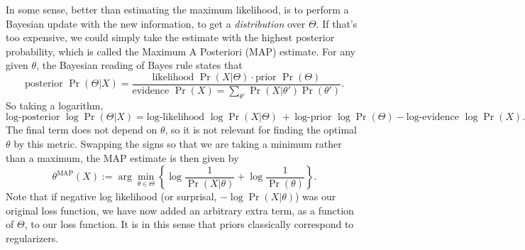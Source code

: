 \begin{subappendices}
In some sense, better than estimating the maximum likelihood, is to perform a Bayesian update with the new information, to get a \emph{distribution} over $\Theta$.
If that's too expensive, we could simply take the estimate with the highest posterior probability, which is called the Maximum A Posteriori (MAP) estimate.
For any given $\theta$, the Bayesian reading of Bayes rule states that
\[
	\text{posterior $\Pr(\Theta | X)$} = \frac
		{\text{likelihood $\Pr(X|\Theta)$}\cdot\text{prior $\Pr(\Theta)$}}{\text{evidence $\Pr(X) = \sum_{\theta'} \Pr(X|\theta')\Pr(\theta')$}}.
\]
So taking a logarithm,
\[
	\text{log-posterior $\log \Pr(\Theta | X)$} = \text{log-likelihood $\log \Pr(X|\Theta)$} ~+~ \text{log-prior $\log \Pr(\Theta)$}
		- \text{log-evidence $\log \Pr(X)$}.
\]
The final term does not depend on $\theta$, so it is not relevant for finding the optimal $\theta$ by this metric. Swapping the signs so that we are taking a minimum rather than a maximum, the MAP estimate is then given by
\[
 	\theta^{\mathrm{MAP}}(X) := \arg\min_{\theta \in \Theta} \left\{ \log \frac{1}{\Pr(X|\theta)} + \log \frac1{\Pr(\theta)} \right\}.
\]
Note that if negative log likelihood (or surprisal, $-\log \Pr(X|\theta)$) was our original loss function, we have now added an arbitrary extra term, as a function of $\Theta$, to our loss function. It is in this sense that priors classically correspond to regularizers.

\end{subappendices}
